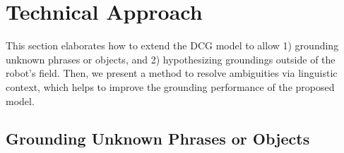 \section{Technical Approach} \label{sec:technical}

This section elaborates how to extend the DCG model to allow 1) grounding unknown phrases or objects, and 2) hypothesizing groundings outside of the robot's field. Then, we present a method to resolve ambiguities via linguistic context, which helps to improve the grounding performance of the proposed model.

\subsection{Grounding Unknown Phrases or Objects}





